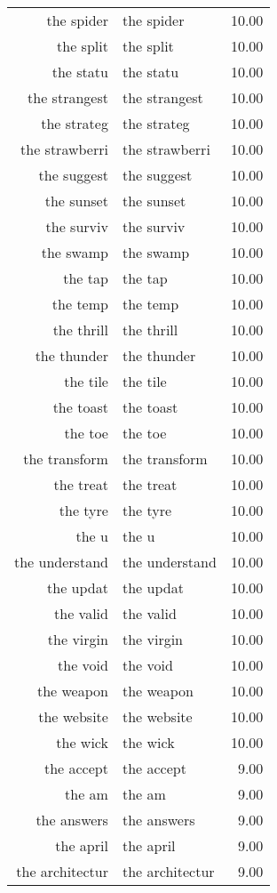 \begin{table}[ht]
\begin{tabular}{rlr}
  the spider & the spider & 10.00 \\ 
  the split & the split & 10.00 \\ 
  the statu & the statu & 10.00 \\ 
  the strangest & the strangest & 10.00 \\ 
  the strateg & the strateg & 10.00 \\ 
  the strawberri & the strawberri & 10.00 \\ 
  the suggest & the suggest & 10.00 \\ 
  the sunset & the sunset & 10.00 \\ 
  the surviv & the surviv & 10.00 \\ 
  the swamp & the swamp & 10.00 \\ 
  the tap & the tap & 10.00 \\ 
  the temp & the temp & 10.00 \\ 
  the thrill & the thrill & 10.00 \\ 
  the thunder & the thunder & 10.00 \\ 
  the tile & the tile & 10.00 \\ 
  the toast & the toast & 10.00 \\ 
  the toe & the toe & 10.00 \\ 
  the transform & the transform & 10.00 \\ 
  the treat & the treat & 10.00 \\ 
  the tyre & the tyre & 10.00 \\ 
  the u & the u & 10.00 \\ 
  the understand & the understand & 10.00 \\ 
  the updat & the updat & 10.00 \\ 
  the valid & the valid & 10.00 \\ 
  the virgin & the virgin & 10.00 \\ 
  the void & the void & 10.00 \\ 
  the weapon & the weapon & 10.00 \\ 
  the website & the website & 10.00 \\ 
  the wick & the wick & 10.00 \\ 
  the accept & the accept & 9.00 \\ 
  the am & the am & 9.00 \\ 
  the answers & the answers & 9.00 \\ 
  the april & the april & 9.00 \\ 
  the architectur & the architectur & 9.00 \\ 

\end{tabular}
\end{table}
